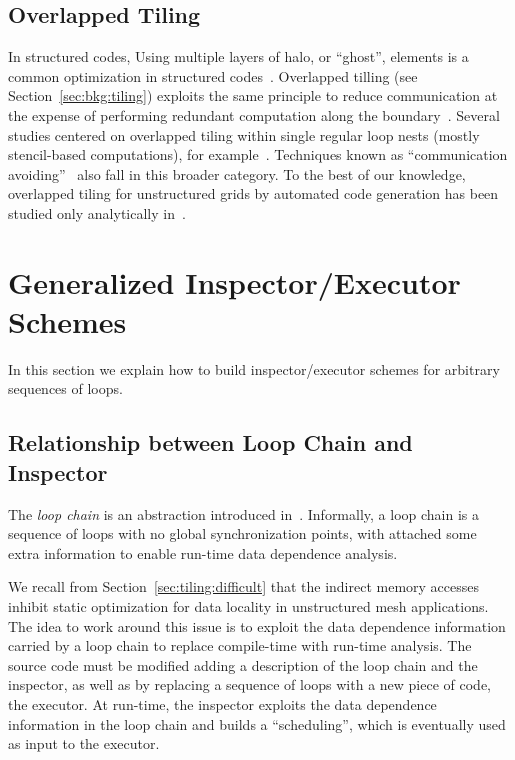 \subsection*{Overlapped Tiling}
In structured codes, Using multiple layers of halo, or ``ghost'', elements is a common optimization in structured codes~\cite{Bassetti98}. Overlapped tilling (see Section~\ref{sec:bkg:tiling}) exploits the same principle to reduce communication at the expense of performing redundant computation along the boundary~\cite{Zhou12}. Several studies centered on overlapped tiling within single regular loop nests (mostly stencil-based computations), for example~\cite{Meng09,Krishnamoorthy07,Chen02}. Techniques known as ``communication avoiding''~\citep{ST-Demmel08,ST-commAvoidingSparse2009} also fall in this broader category. To the best of our knowledge, overlapped tiling for unstructured grids by automated code generation has been studied only analytically in~\cite{gihan-overlapped}.



\section{Generalized Inspector/Executor Schemes}
\label{sec:tiling:lc}
In this section we explain how to build inspector/executor schemes for arbitrary sequences of loops. 

\subsection{Relationship between Loop Chain and Inspector}
The \textit{loop chain} is an abstraction introduced in~\cite{ST-KriegerHIPS2013}. Informally, a loop chain is a sequence of loops with no global synchronization points, with attached some extra information to enable run-time data dependence analysis. 

We recall from Section~\ref{sec:tiling:difficult} that the indirect memory accesses inhibit static optimization for data locality in unstructured mesh applications. The idea to work around this issue is to exploit the data dependence information carried by a loop chain to replace compile-time with run-time analysis. The source code must be modified adding a description of the loop chain and the inspector, as well as by replacing a sequence of loops with a new piece of code, the executor. At run-time, the inspector exploits the data dependence information in the loop chain and builds a ``scheduling'', which is eventually used as input to the executor. 

